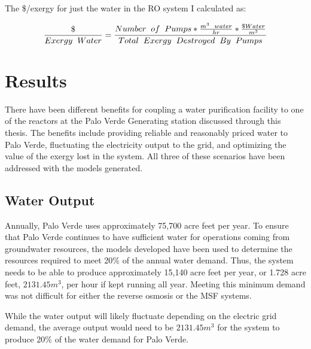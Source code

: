 \documentclass[12pt]{UIdahoMastersThesis}
\begin{document}
The \$/exergy for just the water in the RO system I calculated as:

\begin{equation*}
\frac{\$}{Exergy\hspace{.2cm}Water}=\frac{Number\hspace{.2cm} of \hspace{.2cm}Pumps*\frac{m^3 \hspace{.2cm}water}{hr}*\frac{\$Water}{m^3}}{Total\hspace{.2cm}Exergy\hspace{.2cm}Destroyed\hspace{.2cm}By\hspace{.2cm}Pumps}
\end{equation*}


\section{Results}

There have been different benefits for coupling a water purification facility to one of the reactors at the Palo Verde Generating station discussed through this thesis.  The benefits include providing reliable and reasonably priced water to Palo Verde, fluctuating the electricity output to the grid, and optimizing the value of the exergy lost in the system.  All three of these scenarios have been addressed with the models generated.

\subsection{Water Output}
Annually, Palo Verde uses approximately 75,700 acre feet per year.  To ensure that Palo Verde continues to have sufficient water for operations coming from groundwater resources, the models developed have been used to determine the resources required to meet 20\% of the annual water demand.  Thus, the system needs to be able to produce approximately 15,140 acre feet per year, or 1.728 acre feet, $2131.45 m^3$, per hour if kept running all year. Meeting this minimum demand was not difficult for either the reverse osmosis or the MSF systems.

While the water output will likely fluctuate depending on the electric grid demand, the average output would need to be $2131.45 m^3$ for the system to produce 20\% of the water demand for Palo Verde.
\end{document}
